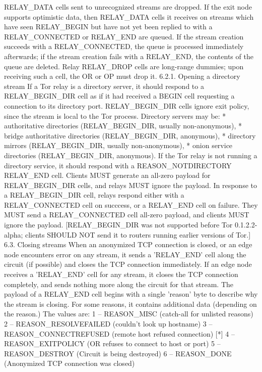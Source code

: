 RELAY_DATA cells sent to unrecognized streams are dropped. If
the exit node supports optimistic data, then RELAY_DATA cells it
receives on streams which have seen RELAY_BEGIN but have not yet
been replied to with a RELAY_CONNECTED or RELAY_END are queued.
If the stream creation succeeds with a RELAY_CONNECTED, the queue
is processed immediately afterwards; if the stream creation fails
with a RELAY_END, the contents of the queue are deleted.
Relay RELAY_DROP cells are long-range dummies; upon receiving such
a cell, the OR or OP must drop it.
6.2.1. Opening a directory stream
If a Tor relay is a directory server, it should respond to a
RELAY_BEGIN_DIR cell as if it had received a BEGIN cell requesting a
connection to its directory port. RELAY_BEGIN_DIR cells ignore exit
policy, since the stream is local to the Tor process.
Directory servers may be:
* authoritative directories (RELAY_BEGIN_DIR, usually non-anonymous),
* bridge authoritative directories (RELAY_BEGIN_DIR, anonymous),
* directory mirrors (RELAY_BEGIN_DIR, usually non-anonymous),
* onion service directories (RELAY_BEGIN_DIR, anonymous).
If the Tor relay is not running a directory service, it should respond
with a REASON_NOTDIRECTORY RELAY_END cell.
Clients MUST generate an all-zero payload for RELAY_BEGIN_DIR cells,
and relays MUST ignore the payload.
In response to a RELAY_BEGIN_DIR cell, relays respond either with a
RELAY_CONNECTED cell on succcess, or a RELAY_END cell on failure. They
MUST send a RELAY_CONNECTED cell all-zero payload, and clients MUST ignore
the payload.
[RELAY_BEGIN_DIR was not supported before Tor 0.1.2.2-alpha; clients
SHOULD NOT send it to routers running earlier versions of Tor.]
6.3. Closing streams
When an anonymized TCP connection is closed, or an edge node
encounters error on any stream, it sends a 'RELAY_END' cell along the
circuit (if possible) and closes the TCP connection immediately. If
an edge node receives a 'RELAY_END' cell for any stream, it closes
the TCP connection completely, and sends nothing more along the
circuit for that stream.
The payload of a RELAY_END cell begins with a single 'reason' byte to
describe why the stream is closing. For some reasons, it contains
additional data (depending on the reason.) The values are:
1 -- REASON_MISC (catch-all for unlisted reasons)
2 -- REASON_RESOLVEFAILED (couldn't look up hostname)
3 -- REASON_CONNECTREFUSED (remote host refused connection) [*]
4 -- REASON_EXITPOLICY (OR refuses to connect to host or port)
5 -- REASON_DESTROY (Circuit is being destroyed)
6 -- REASON_DONE (Anonymized TCP connection was closed)
